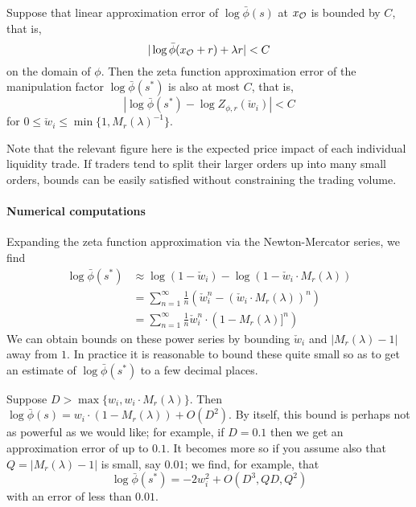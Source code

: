 \begin{proposition}

  Suppose that linear approximation error of $\log\bar\phi(s)$ at $x_{\mathcal{O}}$ is bounded by $C$, that is, 
  \[
    |\log\bar\phi(x_{\mathcal{O}} + r) + \lambda r | < C
  \]
  on the domain of $\phi$.
  Then the zeta function approximation error of the manipulation factor $\log\bar\phi({s^*})$ is also at most $C$, that is,
  \[
    | \log\bar\phi({s^*}) - \log Z_{\phi,r}(\check w_i)| < C
  \]
  for $0\leq \check w_i\leq \min\{1,M_r(\lambda)^{-1}\}$.
  

\end{proposition}

\begin{remark}[Sizing $r$]
  Note that the relevant figure here is the expected price impact of each individual liquidity trade.
  If traders tend to split their larger orders up into many small orders, bounds can be easily satisfied without constraining the trading volume.
\end{remark}

\paragraph{Numerical computations} Expanding the zeta function approximation via the Newton-Mercator series, we find
\begin{align}
  \log\bar\phi({s^*}) &\approx \log(1-\check w_i) - \log ( 1-\check w_i\cdot M_r(\lambda) ) \\
  &= \sum_{n=1}^\infty \frac{1}{n}\left(\check w_i^n - (\check w_i\cdot M_r(\lambda) )^n \right) \\
  &= \sum_{n=1}^\infty \frac{1}{n}\check w_i^n\cdot \left(1  - M_r(\lambda)]^n \right)
\end{align}
We can obtain bounds on these power series by bounding $\check w_i$ and $\left|M_r(\lambda)-1\right|$ away from $1$.
%
In practice it is reasonable to bound these quite small so as to get an estimate of $\log\bar\phi({s^*})$ to a few decimal places.

\begin{example}

  Suppose $D>\max\{w_i,w_i\cdot M_r(\lambda)\}$.
  Then $\log\bar\phi(s) = w_i\cdot(1 - M_r(\lambda)) + O(D^2)$.
%
By itself, this bound is perhaps not as powerful as we would like; for example, if $D=0.1$ then we get an approximation error of up to $0.1$.
%
It becomes more so if you assume also that $Q=|M_r(\lambda)-1|$ is small, say $0.01$; we find, for example, that
\[
  \log\bar\phi({s^*}) = -2w_i^2 + O(D^3, QD, Q^2)
\]
with an error of less than $0.01$.

\end{example}


